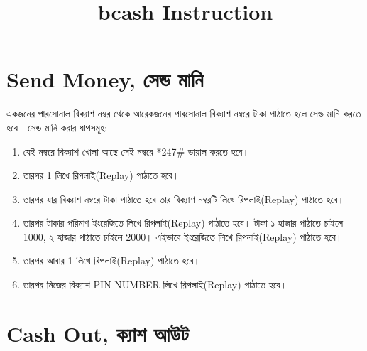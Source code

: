 \documentclass{article}
\title{bcash Instruction}
\begin{document}
\section*{Send Money, সেন্ড মানি}
একজনের পারসোনাল বিক্যাশ নম্বর থেকে আরেকজনের পারসোনাল বিক্যাশ নম্বরে টাকা পাঠাতে হলে সেন্ড মানি করতে হবে। সেন্ড মানি করার ধাপসমূহ: \\
\begin{enumerate}
	\item যেই নম্বরে বিক্যাশ খোলা আছে সেই নম্বরে *247\#  ডায়াল করতে হবে।
	\item তারপর 1 লিখে রিপলাই(Replay) পাঠাতে হবে।
	\item তারপর যার বিক্যাশ নম্বরে টাকা পাঠাতে হবে তার বিক্যাশ নম্বরটি লিখে রিপলাই(Replay) পাঠাতে হবে।
	\item তারপর টাকার পরিমাণ ইংরেজিতে লিখে রিপলাই(Replay) পাঠাতে হবে। টাকা ১ হাজার পাঠাতে চাইলে 1000, ২ হাজার পাঠাতে চাইলে 2000। এইভাবে ইংরেজিতে লিখে রিপলাই(Replay) পাঠাতে হবে।
	\item তারপর আবার 1 লিখে রিপলাই(Replay) পাঠাতে হবে।
	\item তারপর নিজের বিক্যাশ PIN NUMBER লিখে রিপলাই(Replay) পাঠাতে হবে।
\end{enumerate}

\section*{Cash Out, ক্যাশ আউট}
\end{document}
